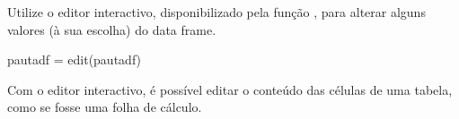 \documentclass{exam}
\begin{document}
\begin{questions}
\question Utilize o editor interactivo, disponibilizado pela função , para alterar alguns valores (à sua escolha) do data frame.

\begin{solution}
	\begin{rcode}
		pautadf = edit(pautadf)
	\end{rcode}
	Com o editor interactivo, é possível editar o conteúdo das células de uma tabela, como se fosse uma folha de cálculo.
\end{solution}
	
\end{questions}
\end{document}

